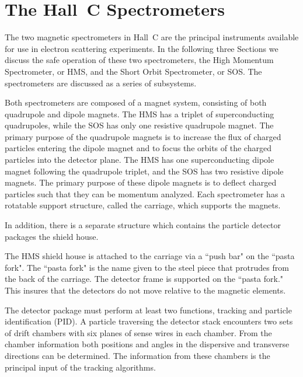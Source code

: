 \chapter{The Hall~C Spectrometers}


	The two magnetic spectrometers in Hall~C are the principal instruments
available for use in electron scattering experiments. In the following three
Sections we discuss the safe operation of these two spectrometers,
the High Momentum Spectrometer, or HMS,
and the Short Orbit Spectrometer, or SOS. The spectrometers are
discussed as a series of subsystems.

Both spectrometers are composed of a magnet system, consisting of both
quadrupole and dipole magnets. The HMS has a triplet of superconducting
quadrupoles, while the SOS has only one resistive quadrupole magnet.
The primary purpose of the quadrupole magnets is to increase the flux of
charged particles entering the dipole magnet and to focus the orbits of the
charged particles into the detector plane.
The HMS has one superconducting dipole magnet following the quadrupole triplet,
and the SOS has two resistive dipole magnets. The primary purpose of these
dipole magnets is to deflect charged particles such that they can be momentum
analyzed.
Each spectrometer has a rotatable support structure, called the
carriage, which supports the magnets.

In addition, there is a separate
structure which contains the particle detector packages the shield house.

The HMS shield house is attached to the carriage via a ``push bar" on the ``pasta
fork".  The ``pasta fork" is the name given to the steel piece that protrudes
from the back of the carriage. The detector frame is supported on the
``pasta fork." This insures that the detectors do not move relative
to the magnetic elements.

The detector package must perform at least two functions, tracking and
particle identification (PID). A particle traversing the detector stack
encounters two sets of drift chambers with six planes of sense
wires in each chamber. From the chamber information both positions
and angles in the dispersive and transverse directions can be determined.
The information from these chambers is the principal input
of the tracking algorithms.

